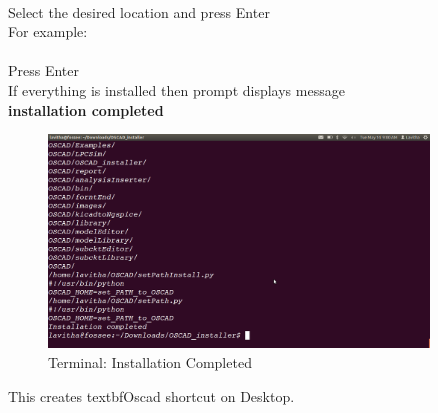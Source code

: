 \\
Select the desired location and press Enter\\
For example:\\
\\
Press Enter\\
If everything is installed then prompt displays message\\
\textbf{installation completed}\\
\begin{figure}[h]
\centering
\includegraphics[width=0.9\textwidth]{figures/install9.png}
\caption{Terminal: Installation Completed}
\label{Terminal: Installation completed}
\end{figure}
This creates textbf{Oscad} shortcut on Desktop.
